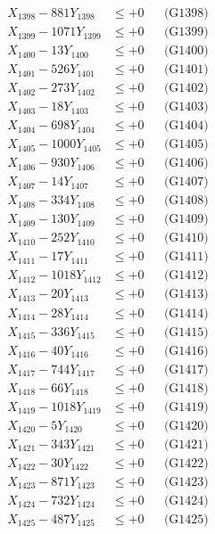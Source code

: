 \documentclass[a4paper,10pt]{article}
\begin{document}
{\begin{align}
X_{1398} - 881Y_{1398} &\leq +0 && \text{(G1398)} \\
X_{1399} - 1071Y_{1399} &\leq +0 && \text{(G1399)} \\
X_{1400} - 13Y_{1400} &\leq +0 && \text{(G1400)} \\
\allowbreak
X_{1401} - 526Y_{1401} &\leq +0 && \text{(G1401)} \\
X_{1402} - 273Y_{1402} &\leq +0 && \text{(G1402)} \\
X_{1403} - 18Y_{1403} &\leq +0 && \text{(G1403)} \\
X_{1404} - 698Y_{1404} &\leq +0 && \text{(G1404)} \\
X_{1405} - 1000Y_{1405} &\leq +0 && \text{(G1405)} \\
X_{1406} - 930Y_{1406} &\leq +0 && \text{(G1406)} \\
X_{1407} - 14Y_{1407} &\leq +0 && \text{(G1407)} \\
X_{1408} - 334Y_{1408} &\leq +0 && \text{(G1408)} \\
X_{1409} - 130Y_{1409} &\leq +0 && \text{(G1409)} \\
X_{1410} - 252Y_{1410} &\leq +0 && \text{(G1410)} \\
\allowbreak
X_{1411} - 17Y_{1411} &\leq +0 && \text{(G1411)} \\
X_{1412} - 1018Y_{1412} &\leq +0 && \text{(G1412)} \\
X_{1413} - 20Y_{1413} &\leq +0 && \text{(G1413)} \\
X_{1414} - 28Y_{1414} &\leq +0 && \text{(G1414)} \\
X_{1415} - 336Y_{1415} &\leq +0 && \text{(G1415)} \\
X_{1416} - 40Y_{1416} &\leq +0 && \text{(G1416)} \\
X_{1417} - 744Y_{1417} &\leq +0 && \text{(G1417)} \\
X_{1418} - 66Y_{1418} &\leq +0 && \text{(G1418)} \\
X_{1419} - 1018Y_{1419} &\leq +0 && \text{(G1419)} \\
X_{1420} - 5Y_{1420} &\leq +0 && \text{(G1420)} \\
\allowbreak
X_{1421} - 343Y_{1421} &\leq +0 && \text{(G1421)} \\
X_{1422} - 30Y_{1422} &\leq +0 && \text{(G1422)} \\
X_{1423} - 871Y_{1423} &\leq +0 && \text{(G1423)} \\
X_{1424} - 732Y_{1424} &\leq +0 && \text{(G1424)} \\
X_{1425} - 487Y_{1425} &\leq +0 && \text{(G1425)} \\

\end{align}}
\end{document}
